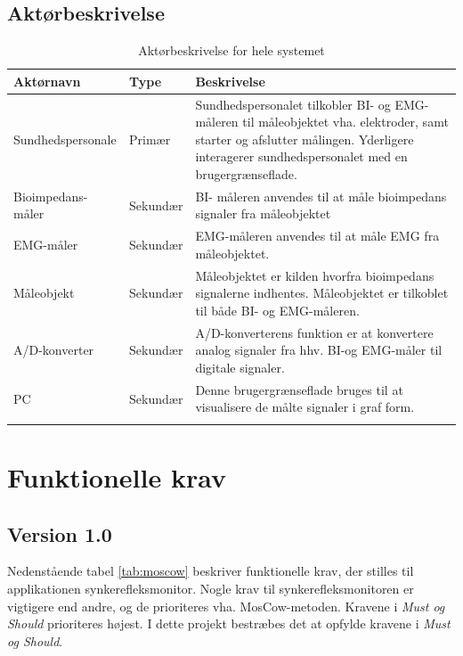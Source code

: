 \subsection{Aktørbeskrivelse}
\begin{table}[H]
\begin{tabularx}{\textwidth}{l l X}
     Aktørnavn	&	Type		&	Beskrivelse \\ \midrule
     Sundhedspersonale   	&  	Primær  	& 	Sundhedspersonalet tilkobler BI- og EMG-måleren til måleobjektet vha. elektroder, samt starter og afslutter målingen. Yderligere interagerer sundhedspersonalet med en brugergrænseflade.     \\ 			  \addlinespace[2mm]
     Bioimpedans-måler	&	Sekundær	& BI- måleren anvendes til at måle bioimpedans signaler fra måleobjektet  	 \\   \addlinespace[2mm]

  EMG-måler	&	Sekundær	&	EMG-måleren anvendes til at måle EMG fra måleobjektet.
     \\   \addlinespace[2mm]
    
    Måleobjekt	&	Sekundær	&	Måleobjektet er kilden  hvorfra bioimpedans signalerne indhentes. Måleobjektet er tilkoblet til både BI- og EMG-måleren.
     \\   \addlinespace[2mm]
     
 A/D-konverter	&	Sekundær	&	A/D-konverterens funktion er at konvertere analog signaler fra hhv. BI-og EMG-måler  til digitale signaler.
     \\   \addlinespace[2mm]      
    PC	&	Sekundær	&	Denne brugergrænseflade bruges til at visualisere de målte signaler i graf form.
     \\   \addlinespace[2mm]
     
   
     \bottomrule                                                                                                                   
    \end{tabularx}
    \caption {Aktørbeskrivelse for hele systemet}
    \label{tab:aktoerbeskrivelse}
	
\end{table}

\pagebreak
\section{Funktionelle krav}
\subsection{Version 1.0}
Nedenstående tabel \ref{tab:moscow} beskriver funktionelle krav, der stilles til applikationen synkerefleksmonitor. Nogle krav til synkerefleksmonitoren er vigtigere end andre, og de prioriteres vha. MosCow-metoden. Kravene i\textit{ Must og Should} prioriteres højest. I dette projekt bestræbes det at opfylde kravene i \textit{ Must og Should}. 

